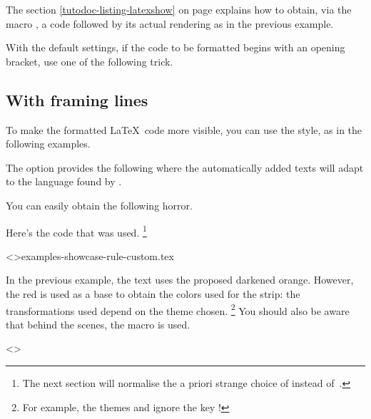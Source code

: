 \begin{tdocrem}
    The section \ref{tutodoc-listing-latexshow} on page \pageref{tutodoc-listing-latexshow} explains how to obtain, via the macro , a code followed by its actual rendering as in the previous example.
\end{tdocrem}


\begin{tdocwarn}
    With the default settings, if the code to be formatted begins with an opening bracket, use one of the following trick.

\end{tdocwarn}


\subsection{With framing lines}

To make the formatted \LaTeX\ code more visible, you can use the  style, as in the following examples.


\begin{tdocexa}
	The  option provides the following where the automatically added texts will adapt to the language found by \thisproj.

	
\end{tdocexa}


\begin{tdocexa}
	You can easily obtain the following horror.

	

	Here's the code that was used.%
	\footnote{
		The next section will normalise the a priori strange choice of  instead of \,.
	}

	\tdoclatexinput<>{examples-showcase-rule-custom.tex}
\end{tdocexa}


\begin{tdocnote}
    In the previous example, the text uses the proposed darkened orange. However, the red is used as a base to obtain the colors used for the strip: the transformations used depend on the theme chosen.%
    \footnote{
        For example, the themes  and  ignore the key !
    }
    You should also be aware that behind the scenes, the macro  is used.

    \begin{tdoclatex}<>
    \end{tdoclatex}
\end{tdocnote}


